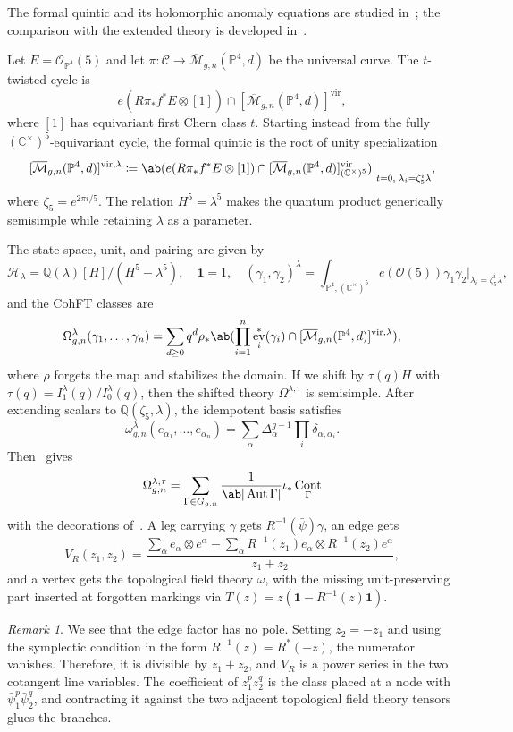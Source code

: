 \documentclass{amsart}
\theoremstyle{definition}
\theoremstyle{remark}
\newtheorem{rmk}[thm]{Remark}
\theoremstyle{plain}
\theoremstyle{definition}
\theoremstyle{remark}
\newcommand{\C}{\mathbb{C}}
\newcommand{\Q}{\mathbb{Q}}
\renewcommand{\P}{\mathbb{P}}
\newcommand{\Mbar}{\overline{\mathcal{M}}}
\newcommand{\mc}[1]{\mathcal{#1}}
\newcommand{\mr}[1]{\mathrm{#1}}
\newcommand{\1}{\mathbf{1}}
\newcommand{\2}{\mathbf{2}}
\newcommand{\3}{\mathbf{3}}
\newcommand{\vir}{\mr{vir}}
\DeclareMathOperator{\Aut}{Aut}
\DeclareMathOperator{\ev}{ev}
\DeclareMathOperator{\Cont}{Cont}
\begin{document}
The formal quintic and its holomorphic anomaly equations are studied in~\cite{LhoPandharipande2019}; the comparison with the extended theory is developed in~\cite{GJRstructure}.

Let \(E = \mc{O}_{\P^4}(5)\) and let \(\pi \colon \mc{C} \to \Mbar_{g,n}(\P^4,d)\) be the universal curve. The \(t\)-twisted cycle is
\[ e(R\pi_* f^* E \otimes [1]) \cap [\Mbar_{g,n}(\P^4,d)]^{\vir}, \]
where \([1]\) has equivariant first Chern class \(t\). Starting instead from the fully \((\C^{\times})^5\)-equivariant cycle, the formal quintic is the root of unity specialization
\[ [\Mbar_{g,n}(\P^4,d)]^{\vir,\lambda} \coloneqq \ab( e(R\pi_*f^*E \otimes [1]) \cap [\Mbar_{g,n}(\P^4,d)]^{\vir}_{(\C^{\times})^5})\Big|_{t=0, \; \lambda_i = \zeta_5^i \lambda}, \]
where \(\zeta_5 = e^{2\pi i/5}\). The relation \(H^5 = \lambda^5\) makes the quantum product generically semisimple while retaining \(\lambda\) as a parameter.

The state space, unit, and pairing are given by
\[ \mc{H}_{\lambda} = \Q(\lambda)[H]/(H^5-\lambda^5), \quad \1 = 1, \quad (\gamma_1,\gamma_2)^{\lambda} = \int_{\P^4, (\C^{\times})^5} e(\mc{O}(5))\gamma_1\gamma_2 \Big|_{\lambda_i = \zeta_5^i\lambda}, \]
and the CohFT classes are
\[ \Omega^{\lambda}_{g,n}(\gamma_1, \ldots, \gamma_n) = \sum_{d \geq 0} q^d \rho_* \ab( \prod_{i=1}^n \ev_i^*(\gamma_i) \cap [\Mbar_{g,n}(\P^4,d)]^{\vir,\lambda}), \]
where \(\rho\) forgets the map and stabilizes the domain. If we shift by \(\tau(q)H\) with \(\tau(q) = I^{\lambda}_1(q)/I^{\lambda}_0(q)\), then the shifted theory \(\Omega^{\lambda,\tau}\) is semisimple. After extending scalars to \(\Q(\zeta_5,\lambda)\), the idempotent basis satisfies
\[ \omega^{\lambda}_{g,n}(e_{\alpha_1}, \ldots, e_{\alpha_n}) = \sum_{\alpha}\Delta_{\alpha}^{g-1}\prod_i \delta_{\alpha,\alpha_i}. \]
Then~ gives
\[ \Omega^{\lambda,\tau}_{g,n} = \sum_{\Gamma \in G_{g,n}} \frac{1}{\ab|\Aut\Gamma|}\iota_* \Cont_{\Gamma} \]
with the decorations of~. A leg carrying \(\gamma\) gets \(R^{-1}(\bar{\psi})\gamma\), an edge gets
\[ V_R(z_1,z_2) = \frac{\sum_{\alpha} e_{\alpha}\otimes e^{\alpha} - \sum_{\alpha} R^{-1}(z_1)e_{\alpha} \otimes R^{-1}(z_2)e^{\alpha}}{z_1+z_2}, \]
and a vertex gets the topological field theory \(\omega\), with the missing unit-preserving part inserted at forgotten markings via \(T(z) = z(\1 - R^{-1}(z)\1)\).

\begin{rmk}
    We see that the edge factor has no pole. Setting \(z_2 = -z_1\) and using the symplectic condition in the form \(R^{-1}(z) = R^*(-z)\), the numerator vanishes. Therefore, it is divisible by \(z_1+z_2\), and \(V_R\) is a power series in the two cotangent line variables. The coefficient of \(z_1^p z_2^q\) is the class placed at a node with \(\bar{\psi}_1^p \bar{\psi}_2^q\), and contracting it against the two adjacent topological field theory tensors glues the branches.
\end{rmk}
\end{document}
